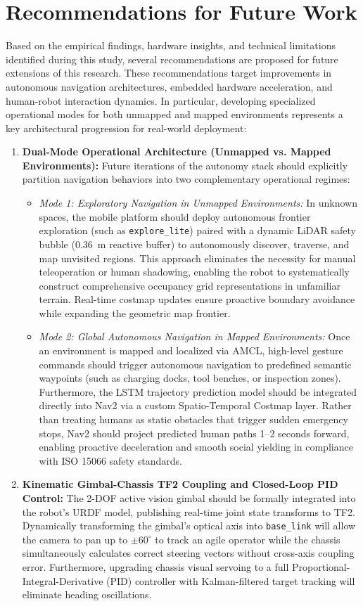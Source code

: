 \section{Recommendations for Future Work}
Based on the empirical findings, hardware insights, and technical limitations identified during this study, several recommendations are proposed for future extensions of this research. These recommendations target improvements in autonomous navigation architectures, embedded hardware acceleration, and human-robot interaction dynamics. In particular, developing specialized operational modes for both unmapped and mapped environments represents a key architectural progression for real-world deployment:

\begin{enumerate}
    \item \textbf{Dual-Mode Operational Architecture (Unmapped vs. Mapped Environments):} Future iterations of the autonomy stack should explicitly partition navigation behaviors into two complementary operational regimes:
    \begin{itemize}
        \item \textit{Mode 1: Exploratory Navigation in Unmapped Environments:} In unknown spaces, the mobile platform should deploy autonomous frontier exploration (such as \texttt{explore\_lite}) paired with a dynamic LiDAR safety bubble (0.36~m reactive buffer) to autonomously discover, traverse, and map unvisited regions. This approach eliminates the necessity for manual teleoperation or human shadowing, enabling the robot to systematically construct comprehensive occupancy grid representations in unfamiliar terrain. Real-time costmap updates ensure proactive boundary avoidance while expanding the geometric map frontier.
        \item \textit{Mode 2: Global Autonomous Navigation in Mapped Environments:} Once an environment is mapped and localized via AMCL, high-level gesture commands should trigger autonomous navigation to predefined semantic waypoints (such as charging docks, tool benches, or inspection zones). Furthermore, the LSTM trajectory prediction model should be integrated directly into Nav2 via a custom Spatio-Temporal Costmap layer. Rather than treating humans as static obstacles that trigger sudden emergency stops, Nav2 should project predicted human paths 1--2 seconds forward, enabling proactive deceleration and smooth social yielding in compliance with ISO 15066 safety standards.
    \end{itemize}
    \item \textbf{Kinematic Gimbal-Chassis TF2 Coupling and Closed-Loop PID Control:} The 2-DOF active vision gimbal should be formally integrated into the robot's URDF model, publishing real-time joint state transforms to TF2. Dynamically transforming the gimbal's optical axis into \texttt{base\_link} will allow the camera to pan up to $\pm 60^\circ$ to track an agile operator while the chassis simultaneously calculates correct steering vectors without cross-axis coupling error. Furthermore, upgrading chassis visual servoing to a full Proportional-Integral-Derivative (PID) controller with Kalman-filtered target tracking will eliminate heading oscillations.

\end{enumerate}

